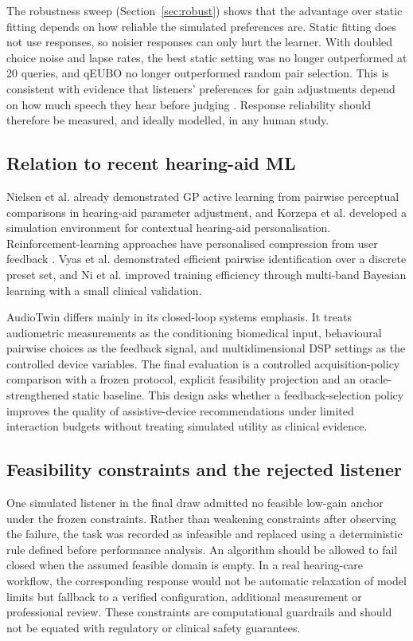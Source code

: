 \documentclass[preprint,12pt]{elsarticle}
\begin{document}
The robustness sweep (Section~\ref{sec:robust}) shows that the advantage over static fitting depends on how reliable the simulated preferences are. Static fitting does not use responses, so noisier responses can only hurt the learner. With doubled choice noise and lapse rates, the best static setting was no longer outperformed at 20 queries, and qEUBO no longer outperformed random pair selection. This is consistent with evidence that listeners' preferences for gain adjustments depend on how much speech they hear before judging \cite{whitmer2022}. Response reliability should therefore be measured, and ideally modelled, in any human study.

\subsection{Relation to recent hearing-aid ML}

Nielsen et al. \cite{nielsen2015} already demonstrated GP active learning from pairwise perceptual comparisons in hearing-aid parameter adjustment, and Korzepa et al. \cite{korzepa2020} developed a simulation environment for contextual hearing-aid personalisation. Reinforcement-learning approaches have personalised compression from user feedback \cite{alamdari2020,akbarzadeh2022}. Vyas et al. \cite{vyas2022} demonstrated efficient pairwise identification over a discrete preset set, and Ni et al. \cite{ni2024} improved training efficiency through multi-band Bayesian learning with a small clinical validation.

AudioTwin differs mainly in its closed-loop systems emphasis. It treats audiometric measurements as the conditioning biomedical input, behavioural pairwise choices as the feedback signal, and multidimensional DSP settings as the controlled device variables. The final evaluation is a controlled acquisition-policy comparison with a frozen protocol, explicit feasibility projection and an oracle-strengthened static baseline. This design asks whether a feedback-selection policy improves the quality of assistive-device recommendations under limited interaction budgets without treating simulated utility as clinical evidence.

\subsection{Feasibility constraints and the rejected listener}

One simulated listener in the final draw admitted no feasible low-gain anchor under the frozen constraints. Rather than weakening constraints after observing the failure, the task was recorded as infeasible and replaced using a deterministic rule defined before performance analysis. An algorithm should be allowed to fail closed when the assumed feasible domain is empty. In a real hearing-care workflow, the corresponding response would not be automatic relaxation of model limits but fallback to a verified configuration, additional measurement or professional review. These constraints are computational guardrails and should not be equated with regulatory or clinical safety guarantees.
\end{document}
